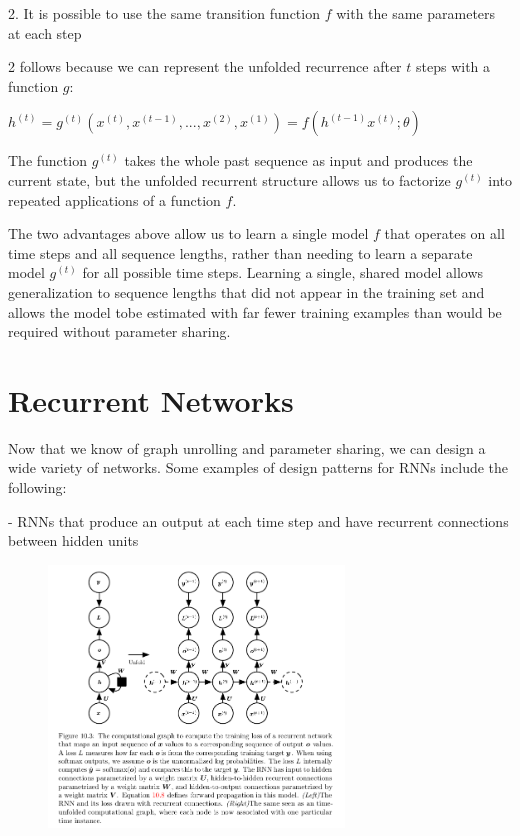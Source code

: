 \documentclass[letterpaper, 12pt]{report}
\begin{document}
2. It is possible to use the same transition function $f$ with the same parameters at each step

2 follows because we can represent the unfolded recurrence after $t$ steps with a function $g$: 

\begin{center}
  $h^{(t)} = g^{(t)}(x^{(t)}, x^{(t-1)}, ..., x^{(2)}, x^{(1)}) = f(h^{(t-1)}x^{(t)}; \theta)$
\end{center}

The function $g^{(t)}$ takes the whole past sequence as input and produces the current state, but the unfolded recurrent structure allows us to factorize $g^{(t)}$ into repeated applications of a function $f$. 

The two advantages above allow us to learn a single model $f$ that operates on all time steps and all sequence lengths, rather than needing to learn a separate model $g^{(t)}$ for all possible time steps. Learning a single, shared model allows generalization to sequence lengths that did not appear in the training set and allows the model tobe estimated with far fewer training examples than would be required without parameter sharing. 

\section{Recurrent Networks}

Now that we know of graph unrolling and parameter sharing, we can design a wide variety of networks. Some examples of design patterns for RNNs include the following:

- RNNs that produce an output at each time step and have recurrent connections between hidden units

\begin{figure}[h]
  \centering
  \includegraphics[width=0.7\textwidth]{rnn_dp_1.png}
\end{figure}
\end{document}
